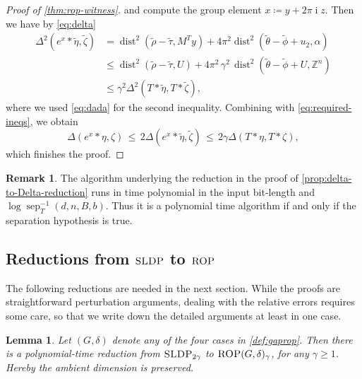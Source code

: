 \documentclass[10pt,a4paper]{article}
\newtheorem{lemma}[theorem]{Lemma}
\theoremstyle{definition}
\newtheorem{remark}[theorem]{Remark}
\DeclareMathOperator{\sep}{sep}
\DeclareMathOperator{\ii}{i}
\DeclareMathOperator{\dist}{dist}
\newcommand{\ZZ}{\mathbb{Z}}
\numberwithin{equation}{section}
\begin{document}
\begin{proof}[Proof of \cref{thm:rop-witness}]
and compute the group element $x\coloneqq y + 2\pi\ii z$.
Then we have by \cref{eq:delta}
\[
\begin{split}
 \Delta^2(e^x\ast\tilde{\eta},\tilde{\zeta}) &= \dist^2(\tilde{\rho} -\tilde{\tau},M^Ty)
  + 4\pi^2 \dist^2( \tilde{\theta} -\tilde{\phi} + u_2,\alpha)\\
   &\leq \dist^2(\tilde{\rho} -\tilde{\tau}, U)
    + 4\pi^2\, \gamma^2 \, \dist^2( \tilde\theta -\tilde\phi + U, \ZZ^n)\\
   &\leq \gamma^2 \Delta^2(T\ast\tilde{\eta},T\ast\tilde{\zeta}) ,
\end{split}
\]
where we used \cref{eq:dada} for the second inequality.
Combining with \cref{eq:required-ineqs}, we obtain
\[
 \Delta(e^x\ast\eta,\zeta) \, \leq \, 2 \Delta(e^x\ast\tilde{\eta},\tilde{\zeta})
  \, \leq \, 2\gamma \Delta(T\ast\eta,T\ast\zeta) ,
\]
which finishes the proof.
\end{proof}


\begin{remark}\label{rem:poly-time-iff-sep-hyp}
The algorithm underlying the reduction
in the proof of \cref{prop:delta-to-Delta-reduction}
runs in time polynomial in the input bit-length and $\log\sep_T^{-1}(d,n,B,b)$.
Thus it is a polynomial time algorithm if and only if the separation hypothesis is true.
\end{remark}

\subsection{Reductions from \texorpdfstring{$\textsc{SLDP}$}{SLDP} to \texorpdfstring{$\textsc{ROP}$}{ROP}}
The following reductions are needed in the next section.
While the proofs are straightforward perturbation arguments,
dealing with the relative errors requires some care,
so that we write down the detailed arguments at least in one case.


\begin{lemma}\label{thm:sldp-is-hard-and-reductions}
Let $(G,\delta)$ denote any of the four cases in \cref{def:gaprop}.
Then there is a polynomial-time reduction from
$\textsc{SLDP}_{2\gamma}$ to $\textsc{ROP}(G,\delta)_\gamma$,
for any $\gamma \ge 1$.
Hereby the ambient dimension is preserved.
\end{lemma}
\end{document}
